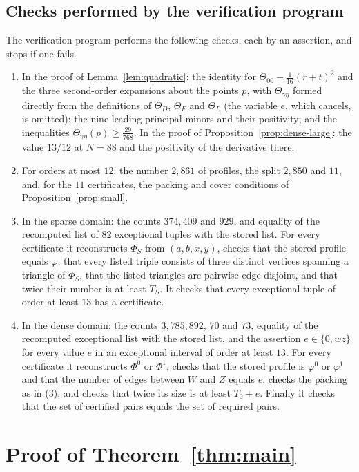 \documentclass{amsart}
\theoremstyle{definition}
\numberwithin{equation}{section}
\numberwithin{table}{section}
\begin{document}
\subsection{Checks performed by the verification program}\label{sec:checks}
The verification program performs the following checks, each by an assertion, and stops if one fails.
\begin{enumerate}
\item In the proof of Lemma~\ref{lem:quadratic}: the identity for $\Theta_{00}-\frac1{16}(r+t)^2$ and the three second-order expansions about the points $p$, with $\Theta_{\gamma\eta}$ formed directly from the definitions of $\Theta_D$, $\Theta_F$ and $\Theta_L$ (the variable $e$, which cancels, is omitted); the nine leading principal minors and their positivity; and the inequalities $\Theta_{\gamma\eta}(p)\ge\frac{29}{768}$. In the proof of Proposition~\ref{prop:dense-large}: the value $13/12$ at $N=88$ and the positivity of the derivative there.
\item For orders at most $12$: the number $2{,}861$ of profiles, the split $2{,}850$ and $11$, and, for the $11$ certificates, the packing and cover conditions of Proposition~\ref{prop:small}.
\item In the sparse domain: the counts $374{,}409$ and $929$, and equality of the recomputed list of $82$ exceptional tuples with the stored list. For every certificate it reconstructs $\Phi_S$ from $(a,b,x,y)$, checks that the stored profile equals $\varphi$, that every listed triple consists of three distinct vertices spanning a triangle of $\Phi_S$, that the listed triangles are pairwise edge-disjoint, and that twice their number is at least $T_S$. It checks that every exceptional tuple of order at least $13$ has a certificate.
\item In the dense domain: the counts $3{,}785{,}892$, $70$ and $73$, equality of the recomputed exceptional list with the stored list, and the assertion $e\in\{0,wz\}$ for every value $e$ in an exceptional interval of order at least $13$. For every certificate it reconstructs $\Phi^0$ or $\Phi^1$, checks that the stored profile is $\varphi^0$ or $\varphi^1$ and that the number of edges between $W$ and $Z$ equals $e$, checks the packing as in (3), and checks that twice its size is at least $T_0+e$. Finally it checks that the set of certified pairs equals the set of required pairs.
\end{enumerate}

\section{Proof of Theorem~\ref{thm:main}}\label{sec:proof}
\end{document}
